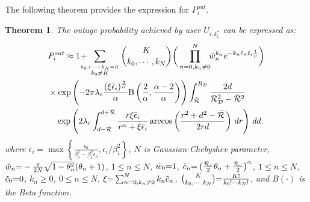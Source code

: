 \documentclass[10pt, doublecolumn]{IEEEtran}
\newtheorem{Theorem}{Theorem}
\begin{document}
The following theorem provides the expression for $P_{i}^{out}$.
\begin{Theorem}
The outage probability achieved by user $U_{i,k_i^*}$ can be expressed as:
\begin{align}\label{NOMA_outage_Pro}
&P_{i}^{out}\approx 1\!+\!\!\!\!\!\!\sum_{
	\overset{k_0+\cdots +k_N=K}{
	k_0\ne K}}{
	K \choose k_0,\cdots ,k_N}\bigg(\prod_{n=0,k_n\ne 0}^N\!\!{\tilde{w}_{n}^{k_n}}e^{-k_n\tilde{c}_n\bar{\epsilon}_i\frac{1}{\rho}}\bigg)\\\notag
&\times \exp \left( -2\pi \lambda _c\frac{(\xi\bar{\epsilon}_i )^{\frac{2}{\alpha}}}{\alpha}\mathrm{B}\left( \frac{2}{\alpha},\frac{\alpha -2}{\alpha} \right) \right)\int_{\bar{\mathcal{R}}}^{R_{\mathcal{D}}}
\frac{2d}{\mathcal{R}_{\mathcal{D}}^2-\bar{\mathcal{R}}^2}\\\notag
&\quad\exp\left(2\lambda_c\int_{d-\bar{\mathcal{R}}}^{d+\bar{\mathcal{R}}}
\frac{r\xi\bar{\epsilon}_i}{r^\alpha+\xi\bar{\epsilon}_i}\arccos\left(\frac{r^2+d^2-\bar{\mathcal{R}}}{2rd}\right)\,dr \right)\,dd.
\end{align}
where $\bar{\epsilon}_i=\max \left\{ \frac{\epsilon_0}{\beta _{0}^{2}-\beta _{1}^{2}\epsilon _0},\epsilon_i/\beta _{1}^{2} \right\}$, $N$ is Gaussian-Chebyshev parameter, $\tilde{w}_n {\color{black}=}-\frac{\pi}{2N}\sqrt{1-\theta_n^2}(\theta_n+1)$, $1\leq n \leq N$, $\tilde{w}_0 {\color{black}=}1$,
$\tilde{c}_n {\color{black}=}\left(\frac{\mathcal{R}_c}{2}\theta_n+\frac{\mathcal{R}_c}{2}\right)^\alpha$, $1\leq n \leq N$, $\tilde{c}_0 {\color{black}=}0$,
$k_n \geq0$, $0\leq n \leq N$,
$\xi {\color{black}=} \sum_{n=0,k_n\neq 0}^{N}k_n\tilde{c}_n$,
${K \choose k_0,\cdots,k_N} {\color{black}=}\frac{K!}{k_0!\cdots k_N!}$,
and $B(\cdot)$ is the Beta function.
\end{Theorem}
\end{document}
